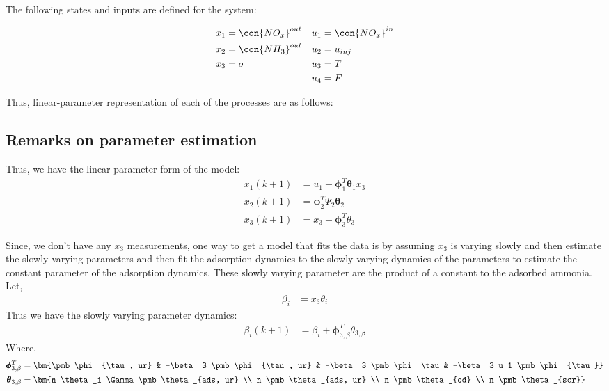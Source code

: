 The following states and inputs are defined for the system:

\begin{align*}
    x_1 &= \con{NO_x}^{out} & u_1 &= \con{NO_x}^{in} \\
    x_2 &= \con{NH_3}^{out} & u_2 &= u_{inj} \\
    x_3 &= \sigma & u_3 &= T\\
        &         & u_4 &= F
\end{align*}

Thus, linear-parameter representation of each of the processes are as follows:






\subsection{Remarks on parameter estimation}
Thus, we have the linear parameter form of the model:
\begin{align*}
    x_1(k+1) &= u_1 + \pmb \phi_1^T  \pmb \theta_1 x_3 \\
    x_2(k+1) &= \pmb \phi_2 ^T \Psi_2 \pmb \theta_2 \\
    x_3(k+1) &= x_3 + \pmb \phi_3^T \theta_3
\end{align*}

Since, we don't have any $x_3$ measurements, one way to get a model that fits the data is by assuming $x_3$ is varying slowly and then estimate the slowly varying parameters and then fit the adsorption dynamics to the slowly varying dynamics of the parameters to estimate the constant parameter of the adsorption dynamics. These slowly varying parameter are the product of a constant to the adsorbed ammonia. Let,
\begin{align*}
    \beta_i &= x_3 \theta_i
\end{align*}
Thus we have the slowly varying parameter dynamics:
\begin{align*}
    \beta_i(k+1) &= \beta_i + \pmb \phi_{3, \beta}^T \theta_{3, \beta}
\end{align*}
Where,
\begin{align*}
    \pmb \phi_{3, \beta}^T &= \bm{\pmb \phi_{\tau, ur} &
                                -\beta_3 \pmb \phi_{\tau, ur} &
                                -\beta_3 \pmb \phi_\tau  &
                                -\beta_3 u_1 \pmb \phi_{\tau}} \\
    \pmb \theta_{3, \beta} &= \bm{n \theta_i \Gamma \pmb \theta_{ads, ur} \\
                             n \pmb \theta_{ads, ur}    \\
                             n \pmb \theta_{od}         \\
                             n \pmb \theta_{scr}}
\end{align*}
